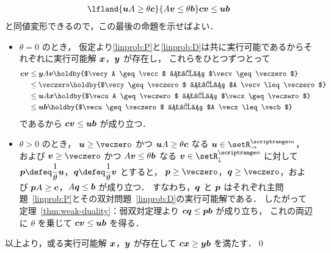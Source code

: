 \documentclass[a4paper]{jsarticle}
\begin{document}
{\begin{align*}
{{{{{            }{
              \lfland{\vecu A \geq \theta \vecc}{A \vecv \leq \theta \vecb}
            }
          }{
            \vecc \vecv \leq \vecu \vecb
          }
        }}}
      \end{align*}
      と同値変形できるので，この最後の命題を示せばよい．
      \begin{itemize}
      \item $\theta = 0$ のとき，
        仮定より\eqref{linprob:P}と\eqref{linprob:D}は共に実行可能であるからそれぞれに実行可能解 $\bm{x}$，$\bm{y}$ が存在し，
        これらをひとつずつとって
        \begin{align*}
          \vecc \vecv
          &\leq \vecy A \vecv
            \holdby{$\vecy A \geq \vecc$ および $\vecv \geq \veczero$}
        \\&\leq \veczero
            \holdby{$\vecy \geq \veczero$ および $A \vecv \leq \veczero$}
        \\&\leq \vecu A \vecx
            \holdby{$\vecu A \geq \veczero$ および $\vecx \geq \veczero$}
        \\&\leq \vecu \vecb
            \holdby{$\vecu \geq \veczero$ および $A \vecx \leq \vecb$}
        \end{align*}
        であるから $\bm{c} \bm{v} \leq \bm{u} \bm{b}$ が成り立つ．
      \item $\theta > 0$ のとき，
        $\vecu \geq \veczero$ かつ $\bm{u} A \geq \theta \bm{c}$ なる $\vecu \in \setrowvec{\setR}{m}$，および
        $\vecv \geq \veczero$ かつ $A \bm{v} \leq \theta \bm{b}$ なる $\vecv \in \setcolvec{\setR}{n}$ に対して
        $\DS \vecp \defeq \frac{1}{\theta} \vecu$，$\DS \vecq \defeq \frac{1}{\theta} \vecv$ とすると，
        $\vecp \geq \veczero$，$\vecq \geq \veczero$，および $\bm{p} A \geq \bm{c}$，$A \bm{q} \leq \bm{b}$ が成り立つ．
        すなわち，$\bm{q}$ と $\bm{p}$ はそれぞれ主問題~\eqref{linprob:P}とその双対問題~\eqref{linprob:D}の実行可能解である．
        したがって定理~\ref{thm:weak-duality}：弱双対定理より $\bm{c} \bm{q} \leq \bm{p} \bm{b}$ が成り立ち，
        これの両辺に $\theta$ を乗じて $\bm{c} \bm{v} \leq \bm{u} \bm{b}$ を得る．
      \end{itemize}
      以上より，或る実行可能解 $\bm{x}$，$\bm{y}$ が存在して $\bm{c} \bm{x} \geq \bm{y} \bm{b}$ を満たす．\qed
    }
\end{document}
